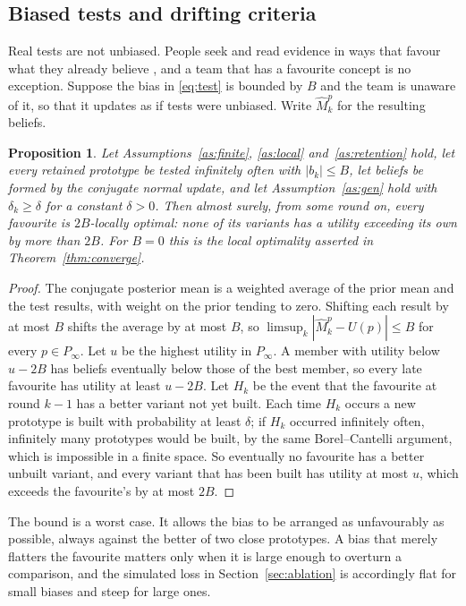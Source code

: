 \documentclass[10pt,twocolumn]{article}
\newtheorem{proposition}{Proposition}
\theoremstyle{definition}
\begin{document}
\subsection{Biased tests and drifting criteria}
\label{sec:bias}

Real tests are not unbiased. People seek and read evidence in ways that favour what they already believe \citep{nickerson1998}, and a team that has a favourite concept is no exception. Suppose the bias in \eqref{eq:test} is bounded by $B$ and the team is unaware of it, so that it updates as if tests were unbiased. Write $\widehat M^p_k$ for the resulting beliefs.

\begin{proposition}
\label{prop:bias}
Let Assumptions~\ref{as:finite}, \ref{as:local} and~\ref{as:retention} hold, let every retained prototype be tested infinitely often with $|b_k|\le B$, let beliefs be formed by the conjugate normal update, and let Assumption~\ref{as:gen} hold with $\delta_k\ge\delta$ for a constant $\delta>0$. Then almost surely, from some round on, every favourite is $2B$-locally optimal: none of its variants has a utility exceeding its own by more than $2B$. For $B=0$ this is the local optimality asserted in Theorem~\ref{thm:converge}.
\end{proposition}

\begin{proof}
The conjugate posterior mean is a weighted average of the prior mean and the test results, with weight on the prior tending to zero. Shifting each result by at most $B$ shifts the average by at most $B$, so $\limsup_k|\widehat M^p_k-U(p)|\le B$ for every $p\in P_\infty$. Let $u$ be the highest utility in $P_\infty$. A member with utility below $u-2B$ has beliefs eventually below those of the best member, so every late favourite has utility at least $u-2B$. Let $H_k$ be the event that the favourite at round $k-1$ has a better variant not yet built. Each time $H_k$ occurs a new prototype is built with probability at least $\delta$; if $H_k$ occurred infinitely often, infinitely many prototypes would be built, by the same Borel--Cantelli argument, which is impossible in a finite space. So eventually no favourite has a better unbuilt variant, and every variant that has been built has utility at most $u$, which exceeds the favourite's by at most $2B$.
\end{proof}

The bound is a worst case. It allows the bias to be arranged as unfavourably as possible, always against the better of two close prototypes. A bias that merely flatters the favourite matters only when it is large enough to overturn a comparison, and the simulated loss in Section~\ref{sec:ablation} is accordingly flat for small biases and steep for large ones.
\end{document}
